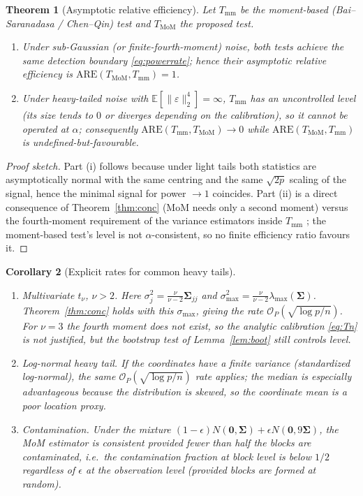 \documentclass[pdflatex,sn-mathphys-num]{sn-jnl}
\newcommand{\bSig}{\boldsymbol{\Sigma}}
\newcommand{\bzero}{\mathbf{0}}
\newcommand{\E}{\mathbb{E}}
\newcommand{\normt}[1]{\lVert #1 \rVert_2}
\theoremstyle{thmstyleone}%
\newtheorem{theorem}{Theorem}%
\newtheorem{corollary}[theorem]{Corollary}%
\theoremstyle{thmstyletwo}%
\theoremstyle{thmstylethree}%
\begin{document}
\begin{theorem}[Asymptotic relative efficiency]
\label{thm:are}
Let $T_{\mathrm{mm}}$ be the moment-based (Bai--Saranadasa / Chen--Qin) test and
$T_{\mathrm{MoM}}$ the proposed test.
\begin{enumerate}
    \item[(i)] Under sub-Gaussian (or finite-fourth-moment) noise, both tests
    achieve the same detection boundary \eqref{eq:powerrate}; hence their
    asymptotic relative efficiency is $\mathrm{ARE}(T_{\mathrm{MoM}},T_{\mathrm{mm}})=1$.
    \item[(ii)] Under heavy-tailed noise with $\E[\normt{\varepsilon}^4]=\infty$,
    $T_{\mathrm{mm}}$ has an uncontrolled level (its size tends to $0$ or
    diverges depending on the calibration), so it cannot be operated at $\alpha$;
    consequently $\mathrm{ARE}(T_{\mathrm{mm}},T_{\mathrm{MoM}})\to 0$ while
    $\mathrm{ARE}(T_{\mathrm{MoM}},T_{\mathrm{mm}})$ is undefined-but-favourable.
\end{enumerate}
\end{theorem}
\begin{proof}[Proof sketch]
Part (i) follows because under light tails both statistics are asymptotically
normal with the same centring and the same $\sqrt{2p}$ scaling of the signal,
hence the minimal signal for power $\to 1$ coincides. Part (ii) is a direct
consequence of Theorem~\ref{thm:conc} (MoM needs only a second moment) versus
the fourth-moment requirement of the variance estimators inside
$T_{\mathrm{mm}}$ \citep{bai1996,chen2010}; the moment-based test's level is not
$\alpha$-consistent, so no finite efficiency ratio favours it.
\end{proof}

\begin{corollary}[Explicit rates for common heavy tails]
\label{cor:rates}
\begin{enumerate}
    \item[(a)] \emph{Multivariate $t_\nu$, $\nu>2$.} Here
    $\sigma_j^2=\frac{\nu}{\nu-2}\bSig_{jj}$ and
    $\sigma_{\max}^2=\frac{\nu}{\nu-2}\lambda_{\max}(\bSig)$. Theorem~\ref{thm:conc}
    holds with this $\sigma_{\max}$, giving the rate
    $\mathcal{O}_P(\sqrt{\log p/n})$. For $\nu=3$ the fourth moment does not
    exist, so the analytic calibration \eqref{eq:Tn} is not justified, but the
    bootstrap test of Lemma~\ref{lem:boot} still controls level.
    \item[(b)] \emph{Log-normal heavy tail.} If the coordinates have a finite
    variance (standardized log-normal), the same $\mathcal{O}_P(\sqrt{\log p/n})$
    rate applies; the median is especially advantageous because the
    distribution is skewed, so the coordinate mean is a poor location proxy.
    \item[(c)] \emph{Contamination.} Under the mixture
    $(1-\epsilon)N(\bzero,\bSig)+\epsilon N(\bzero,9\bSig)$, the MoM estimator
    is consistent provided fewer than half the \emph{blocks} are contaminated,
    i.e.\ the contamination fraction at block level is below $1/2$ regardless of
    $\epsilon$ at the observation level (provided blocks are formed at random).
\end{enumerate}
\end{corollary}
\end{document}
